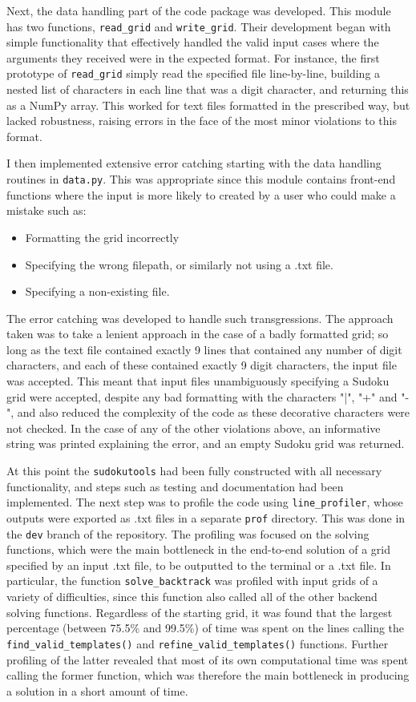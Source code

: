 \documentclass[12pt]{article}
\begin{document}
Next, the data handling part of the code package was developed.
This module has two functions, \texttt{read\_grid} and \texttt{write\_grid}.
Their development began with simple functionality that effectively handled the valid input cases where the arguments they received were in the expected format.
For instance, the first prototype of \texttt{read\_grid} simply read the specified file line-by-line, building a nested list of characters in each line that was a digit character, and returning this as a NumPy array.
This worked for text files formatted in the prescribed way, but lacked robustness, raising errors in the face of the most minor violations to this format.

I then implemented extensive error catching starting with the data handling routines in \texttt{data.py}.
This was appropriate since this module contains front-end functions where the input is more likely to created by a user who could make a mistake such as:
\begin{itemize}
    \item Formatting the grid incorrectly
    \item Specifying the wrong filepath, or similarly not using a .txt file.
    \item Specifying a non-existing file.
\end{itemize}
The error catching was developed to handle such transgressions.
The approach taken was to take a lenient approach in the case of a badly formatted grid; so long as the text file contained exactly 9 lines that contained any number of digit characters, and each of these contained exactly 9 digit characters, the input file was accepted.
This meant that input files unambiguously specifying a Sudoku grid were accepted, despite any bad formatting with the characters "|", "+" and "-", and also reduced the complexity of the code as these decorative characters were not checked.
In the case of any of the other violations above, an informative string was printed explaining the error, and an empty Sudoku grid was returned.

At this point the \texttt{sudokutools} had been fully constructed with all necessary functionality, and steps such as testing and documentation had been implemented.
The next step was to profile the code using \texttt{line\_profiler}, whose outputs were exported as .txt files in a separate \texttt{prof} directory.
This was done in the \texttt{dev} branch of the repository.
The profiling was focused on the solving functions, which were the main bottleneck in the end-to-end solution of a grid specified by an input .txt file, to be outputted to the terminal or a .txt file.
In particular, the function \texttt{solve\_backtrack} was profiled with input grids of a variety of difficulties, since this function also called all of the other backend solving functions.
Regardless of the starting grid, it was found that the largest percentage (between 75.5\% and 99.5\%) of time was spent on the lines calling the \texttt{find\_valid\_templates()} and \texttt{refine\_valid\_templates()} functions.
Further profiling of the latter revealed that most of its own computational time was spent calling the former function, which was therefore the main bottleneck in producing a solution in a short amount of time.
\end{document}
